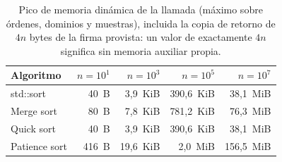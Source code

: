 %
\begin{table}[H]
\centering
\small
\caption{Pico de memoria dinámica de la llamada (máximo sobre órdenes, dominios y muestras), incluida la copia de retorno de $4n$ bytes de la firma provista: un valor de exactamente $4n$ significa sin memoria auxiliar propia.}
\label{tab:sorting-memory}
\begin{tabular}{lrrrr}
\hline\hline
Algoritmo & $n=10^{1}$ & $n=10^{3}$ & $n=10^{5}$ & $n=10^{7}$ \\
\hline
std::sort & 40~B & 3,9~KiB & 390,6~KiB & 38,1~MiB \\
Merge sort & 80~B & 7,8~KiB & 781,2~KiB & 76,3~MiB \\
Quick sort & 40~B & 3,9~KiB & 390,6~KiB & 38,1~MiB \\
Patience sort & 416~B & 19,6~KiB & 2,0~MiB & 156,5~MiB \\
\hline\hline
\end{tabular}
\end{table}
